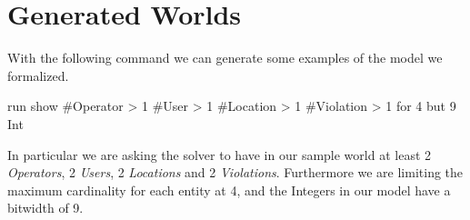 \section{Generated Worlds}
With the following command we can generate some examples of the model we 
formalized.

\begin{alloy}
    run show {
        #Operator > 1
        #User > 1
        #Location > 1
        #Violation > 1
    } for 4 but 9 Int
\end{alloy}
In particular we are asking the solver to have in our sample world at least 2
\emph{Operators}, 2 \emph{Users}, 2 \emph{Locations} and 2 \emph{Violations}.
Furthermore we are limiting the maximum cardinality for each entity at 4, and
the Integers in our model have a bitwidth of 9.